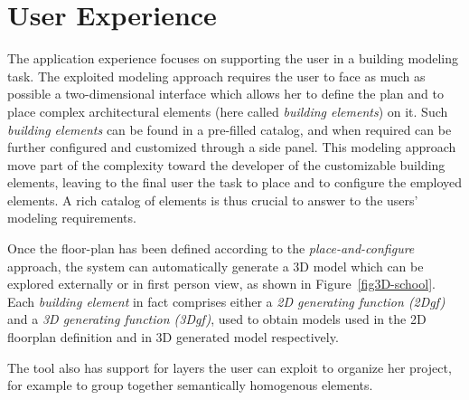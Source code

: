 \section{User Experience}
\label{sec:chapter_2_section_5}

The application experience focuses on supporting the user in a building modeling task. The exploited modeling approach requires the user to face as much as possible a two-dimensional interface which allows her to define the plan and to place complex architectural elements (here called \emph{building elements}) on it. Such \emph{building elements} can be found in a pre-filled catalog, and when required can be further configured and customized through a side panel. This modeling approach move part of the complexity toward the developer of the customizable building elements, leaving to the final user the task to place and to configure the employed elements. A rich catalog of elements is thus crucial to answer to the users' modeling requirements.

Once the floor-plan has been defined according to the \emph{place-and-configure} approach, the system can automatically generate a 3D model which can be explored externally or in first person view, as shown in Figure~\ref{fig3D-school}. Each  \emph{building element} in fact comprises either a \emph{2D generating function (2Dgf)} and a \emph{3D generating function (3Dgf)}, used to obtain models used in the 2D floorplan definition and in 3D generated model respectively.

The tool also has support for layers the user can exploit to organize her project, for example to group together semantically homogenous elements.
